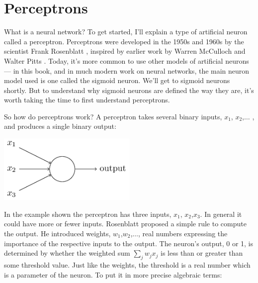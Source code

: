 \section{Perceptrons}

What is a neural network? To get started, I'll explain a type of artificial neuron called a perceptron. Perceptrons were developed in the 1950s and 1960s by the scientist Frank Rosenblatt \cite{rosenblatt1962principles}, inspired by earlier work by Warren McCulloch and Walter Pitts \cite{McCulloch1943}. Today, it's more common to use other models of artificial neurons --- in this book, and in much modern work on neural networks, the main neuron model used is one called the sigmoid neuron. We'll get to sigmoid neurons shortly. But to understand why sigmoid neurons are defined the way they are, it's worth taking the time to first understand perceptrons.

So how do perceptrons work? A perceptron takes several binary inputs, $x_1$, $x_2$,$\ldots$ , and produces a single binary output: 

{\centering
\includegraphics[width=0.5\textwidth,]{pic/simpleperceptron}
\par}

In the example shown the perceptron has three inputs, $x_1$, $x_2$,$x_3$. In general it could have more or fewer inputs. Rosenblatt proposed a simple rule to compute the output. He introduced weights, $w_1$,$w_2$,$\ldots$, real numbers expressing the importance of the respective inputs to the output. The neuron's output, 0 or 1, is determined by whether the weighted sum $\sum_j w_j x_j$ is less than or greater than some threshold value. Just like the weights, the threshold is a real number which is a parameter of the neuron. To put it in more precise algebraic terms: 


